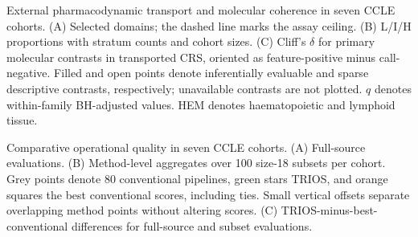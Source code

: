 \caption{External pharmacodynamic transport and molecular coherence in seven CCLE cohorts. (A) Selected domains; the dashed line marks the assay ceiling. (B) L/I/H proportions with stratum counts and cohort sizes. (C) Cliff's \(\delta\) for primary molecular contrasts in transported CRS, oriented as feature-positive minus call-negative. Filled and open points denote inferentially evaluable and sparse descriptive contrasts, respectively; unavailable contrasts are not plotted. \(q\) denotes within-family BH-adjusted values. HEM denotes haematopoietic and lymphoid tissue.}
\label{fig:ccle-transport-molecular}

\caption{Comparative operational quality in seven CCLE cohorts. (A) Full-source evaluations. (B) Method-level aggregates over 100 size-18 subsets per cohort. Grey points denote 80 conventional pipelines, green stars TRIOS, and orange squares the best conventional scores, including ties. Small vertical offsets separate overlapping method points without altering scores. (C) TRIOS-minus-best-conventional differences for full-source and subset evaluations.}
\label{fig:ccle-comparative}
